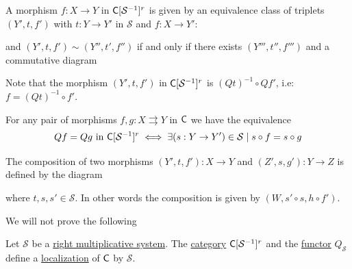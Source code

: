 \documentclass[../../main]{subfiles}
\begin{document}
\begin{remark}\label{rem:properties-right-multiplicative-category}
  A morphism \(f: X \to Y\) in \(\mathsf{C}[\mathcal{S}^{-1}]^{r}\) is given by an equivalence class of triplets \((Y', t, f')\) with \(t: Y \to Y'\) in \(\mathcal{S}\) and \(f: X \to Y'\):
  \begin{center}
  \end{center}
  and \((Y', t, f') \sim (Y'', t', f'')\) if and only if there exists \((Y''', t'', f''')\) and a commutative diagram
  \begin{center}
  \end{center}

  Note that the morphism \((Y', t, f')\) in \(\mathsf{C}[\mathcal{S}^{-1}]^{r}\) is \((Qt)^{-1} \circ Qf'\), i.e: \(f = (Qt)^{-1} \circ f'\).

  For any pair of morphisms \(f, g: X \rightrightarrows Y\) in \(\mathsf{C}\) we have the equivalence
  \begin{equation*}
    Qf = Qg \text{ in } \mathsf{C}[\mathcal{S}^{-1}]^{r} \iff \exists (s: Y \to Y') \in \mathcal{S} \mid s \circ f = s \circ g
  \end{equation*}
 
  The composition of two morphisms \((Y', t, f'): X \to Y\) and \((Z', s, g'): Y \to Z\) is defined by the diagram
  \begin{center}
  \end{center}
  where \(t, s, s' \in \mathcal{S}\).
  In other words the composition is given by \((W, s' \circ s, h \circ f')\).
\end{remark}

We will not prove the following
\begin{theorem}\label{thm:right-multiplicative-is-localization}
  Let \(\mathcal{S}\) be a \hyperref[def:multiplicative-system]{right multiplicative system}.
  The \hyperref[def:category]{category} \(\mathsf{C}[\mathcal{S}^{-1}]^{r}\) and the \hyperref[def:functor]{functor} \(Q_{\mathcal{S}}\) define a \hyperref[def:localization-category]{localization} of \(\mathsf{C}\) by \(\mathcal{S}\).
\end{theorem}
\end{document}
